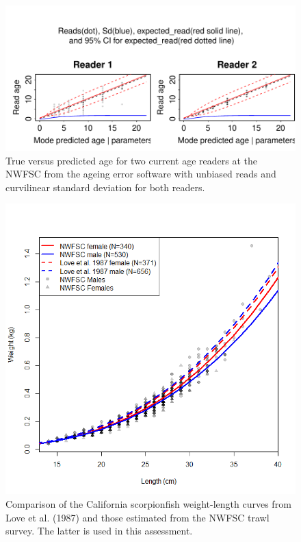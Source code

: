 \documentclass[12pt,]{article}
\begin{document}
\begin{figure}[htbp]
\centering
\includegraphics{Figures/Fleet8_NWFSCTrawl_ageerror2.pdf}
\caption{True versus predicted age for two current age readers at the
NWFSC from the ageing error software with unbiased reads and curvilinear
standard deviation for both readers.
\label{fig:Fleet8_NWFSCTrawl_ageerror2}}
\end{figure}

\begin{figure}[htbp]
\centering
\includegraphics{Figures/Length_weight.png}
\caption{Comparison of the California scorpionfish weight-length curves
from Love et al. (1987) and those estimated from the NWFSC trawl survey.
The latter is used in this assessment. \label{fig:Length_weight}}
\end{figure}
\end{document}
